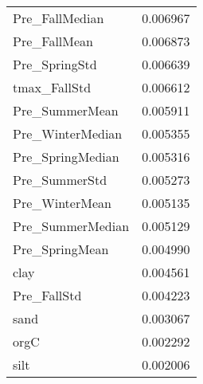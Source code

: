 \begin{tabular}{lr}
Pre_FallMedian & 0.006967 \\
Pre_FallMean & 0.006873 \\
Pre_SpringStd & 0.006639 \\
tmax_FallStd & 0.006612 \\
Pre_SummerMean & 0.005911 \\
Pre_WinterMedian & 0.005355 \\
Pre_SpringMedian & 0.005316 \\
Pre_SummerStd & 0.005273 \\
Pre_WinterMean & 0.005135 \\
Pre_SummerMedian & 0.005129 \\
Pre_SpringMean & 0.004990 \\
clay & 0.004561 \\
Pre_FallStd & 0.004223 \\
sand & 0.003067 \\
orgC & 0.002292 \\
silt & 0.002006 \\
\bottomrule
\end{tabular}
